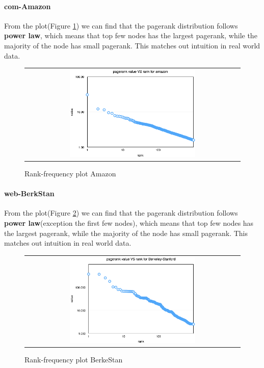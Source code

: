 \paragraph{com-Amazon}
From the plot(Figure \ref{t2:amazon}) we can find that the pagerank distribution follows {\bf power law}, which means that top few nodes has the largest pagerank, while the majority of the node has small pagerank. This matches out intuition in real world data. 
\begin{figure}[!htbf]
\begin{center}
\begin{tabular}{c}
    \includegraphics[width=0.6\textwidth]{FIG/t2_amazon.png}
\end{tabular}
\caption{Rank-frequency plot Amazon}
\label{t2:amazon}
\end{center}
\end{figure}

\paragraph{web-BerkStan}
From the plot(Figure \ref{t2:berke}) we can find that the pagerank distribution follows {\bf power law}(exception the first few nodes), which means that top few nodes has the largest pagerank, while the majority of the node has small pagerank. This matches out intuition in real world data. 
\begin{figure}[!htbf]
\begin{center}
\begin{tabular}{c}
    \includegraphics[width=0.6\textwidth]{FIG/t2_berke.png}
\end{tabular}
\caption{Rank-frequency plot BerkeStan}
\label{t2:berke}
\end{center}
\end{figure}

